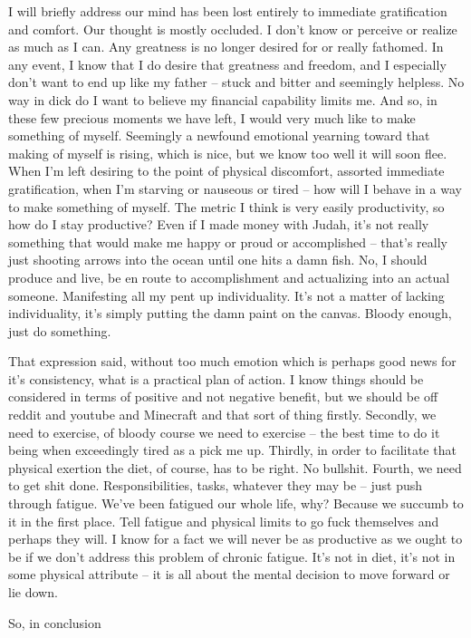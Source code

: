 I will briefly address our mind has been lost entirely to immediate
gratification and comfort. Our thought is mostly occluded. I don't know
or perceive or realize as much as I can. Any greatness is no longer
desired for or really fathomed. In any event, I know that I do desire
that greatness and freedom, and I especially don't want to end up like
my father -- stuck and bitter and seemingly helpless. No way in dick do
I want to believe my financial capability limits me. And so, in these
few precious moments we have left, I would very much like to make
something of myself. Seemingly a newfound emotional yearning toward that
making of myself is rising, which is nice, but we know too well it will
soon flee. When I'm left desiring to the point of physical discomfort,
assorted immediate gratification, when I'm starving or nauseous or tired
-- how will I behave in a way to make something of myself. The metric I
think is very easily productivity, so how do I stay productive? Even if
I made money with Judah, it's not really something that would make me
happy or proud or accomplished -- that's really just shooting arrows
into the ocean until one hits a damn fish. No, I should produce and
live, be en route to accomplishment and actualizing into an actual
someone. Manifesting all my pent up individuality. It's not a matter of
lacking individuality, it's simply putting the damn paint on the canvas.
Bloody enough, just do something.

\qquad That expression said, without too much emotion which is perhaps
good news for it's consistency, what is a practical plan of action. I
know things should be considered in terms of positive and not negative
benefit, but we should be off reddit and youtube and Minecraft and that
sort of thing firstly. Secondly, we need to exercise, of bloody course
we need to exercise -- the best time to do it being when exceedingly
tired as a pick me up. Thirdly, in order to facilitate that physical
exertion the diet, of course, has to be right. No bullshit. Fourth, we
need to get shit done. Responsibilities, tasks, whatever they may be --
just push through fatigue. We've been fatigued our whole life, why?
Because we succumb to it in the first place. Tell fatigue and physical
limits to go fuck themselves and perhaps they will. I know for a fact we
will never be as productive as we ought to be if we don't address this
problem of chronic fatigue. It's not in diet, it's not in some physical
attribute -- it is all about the mental decision to move forward or lie
down.

\qquad So, in conclusion

